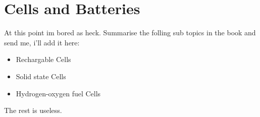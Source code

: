 \documentclass{scrbook}
\begin{document}
\section{Cells and Batteries}

	At this point im bored as heck. Summarise the folling sub topics in the book and send me, i'll add it here:

	\begin{itemize}
		\item
			Rechargable Cells
		\item
			Solid state Cells
		\item
			Hydrogen-oxygen fuel Cells
	\end{itemize}

	The rest is useless.

\printbibliography{}
\end{document}
